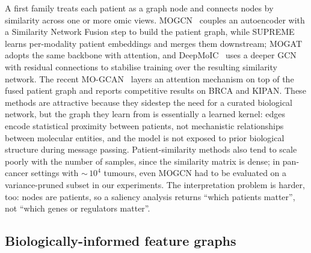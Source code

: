 \documentclass[review,3p,times,11pt, ]{elsarticle} %
\begin{document}
A first family treats each patient as a graph node and connects nodes by
similarity across one or more omic views. MOGCN~\cite{li_mogcn_2022} couples
an autoencoder with a Similarity Network Fusion step to build the patient
graph, while SUPREME~\cite{kesimoglu_supreme_2022} learns per-modality
patient embeddings and merges them downstream; MOGAT~\cite{tanvir_mogat_2024}
adopts the same backbone with attention, and
DeepMoIC~\cite{wu_deepmoic_2024} uses a deeper GCN with residual connections
to stabilise training over the resulting similarity network. The recent
MO-GCAN~\cite{dou_mo-gcan_2025} layers an attention mechanism on top of the
fused patient graph and reports competitive results on BRCA and KIPAN. These
methods are attractive because they sidestep the need for a curated
biological network, but the graph they learn from is essentially a learned
kernel: edges encode statistical proximity between patients, not mechanistic
relationships between molecular entities, and the model is not exposed to
prior biological structure during message passing. 
Patient-similarity methods also tend to scale poorly with the number of samples, since the
similarity matrix is dense; in pan-cancer settings with $\sim$\,$10^4$
tumours, even MOGCN had to be evaluated on a variance-pruned subset
in our experiments. The interpretation problem is harder, too: nodes are
patients, so a saliency analysis returns ``which patients matter'', not
``which genes or regulators matter''.

\subsection{Biologically-informed feature graphs}
\label{ssec:rw_biograph}
\end{document}
